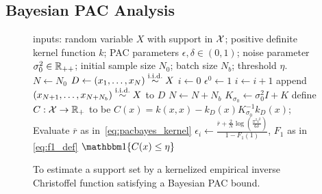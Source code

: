 \documentclass[onefignum,onetabnum]{siamart171218}
\begin{document}
\subsection{Bayesian PAC Analysis}%
\label{sub:bayesian_pac_analysis_of_christoffel_function_estimators} 

\quad

\begin{figure}
\begin{minipage}[t][11cm][t]{0.46\textwidth}
    \begin{algorithm}[H]
        \caption{To estimate a support set by a kernelized empirical inverse
        Christoffel function satisfying a Bayesian PAC bound.}\label{alg:cfun_pacbayes}
        \begin{algorithmic} 
        \STATE inputs: random variable $X$ with support in $\mathcal{X}$; positive definite kernel function $k$; PAC parameters
        $\epsilon,\delta\in(0,1)$; noise parameter $\sigma_0^2\in\mathbb{R}_{++}$;
        initial sample size $N_0$; batch size $N_b$; threshold $\eta$.
        \STATE $N\gets N_0$
        \STATE $D\gets (x_1,\dotsc,x_{N})\overset{\textrm{i.i.d.}}{\sim} X$
        \STATE $i\gets0$
        \STATE $\epsilon^0\gets 1$
            \STATE $i\gets i + 1$
            \STATE append \\ $(x_{N+1},\dotsc,x_{N+N_b})\overset{\textrm{i.i.d.}}{\sim} X$ to $D$
            \STATE $N\gets N+N_b$
            \STATE $K_{\sigma_0}\gets\sigma_0^2I + K$
            \STATE define $C:\mathcal{X}\to\mathbb{R}_{+}$ to be
            $C(x)=k(x,x)-k_D(x)K_{\sigma_0}^{-1}k_D(x)$;
            \STATE Evaluate $\overline{r}$ as in~\eqref{eq:pacbayes_kernel}
            \STATE 
            $\epsilon_i \gets \frac{\bar r + \frac{2}{N}\log (\frac{\pi^2i^2}{6
            \delta})}{1-F_1(1)}$, $F_1$ as in \eqref{eq:f1_def}
        \ENDWHILE 
        \RETURN $\ind{C(x)\le\eta}$
        \end{algorithmic}
    \end{algorithm}
\end{minipage}
\end{figure}
\end{document}
